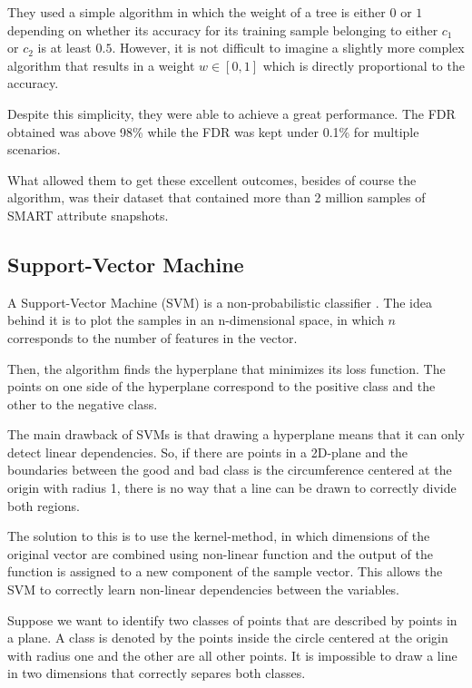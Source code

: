 They used a simple algorithm in which the weight of a tree is either $0$ or $1$ depending on whether its accuracy for its training sample belonging to either $c_1$ or $c_2$ is at least $0.5$.
However, it is not difficult to imagine a slightly more complex algorithm that results in a weight $w \in \left[0,1\right]$ which is directly proportional to the accuracy.

Despite this simplicity, they were able to achieve a great performance.
The FDR obtained was above 98\% while the FDR was kept under 0.1\% for multiple scenarios.

What allowed them to get these excellent outcomes, besides of course the algorithm, was their dataset that contained more than 2 million samples of SMART attribute snapshots.

\subsection{Support-Vector Machine}

A Support-Vector Machine (SVM) is a non-probabilistic classifier \cite{cortes1995support}.
The idea behind it is to plot the samples in an n-dimensional space, in which $n$ corresponds to the number of features in the vector.

Then, the algorithm finds the hyperplane that minimizes its loss function.
The points on one side of the hyperplane correspond to the positive class and the other to the negative class.

The main drawback of SVMs is that drawing a hyperplane means that it can only detect linear dependencies.
So, if there are points in a 2D-plane and the boundaries between the good and bad class is the circumference centered at the origin with radius 1, there is no way that a line can be drawn to correctly divide both regions.

The solution to this is to use the kernel-method, in which dimensions of the original vector are combined using non-linear function and the output of the function is assigned to a new component of the sample vector.
This allows the SVM to correctly learn non-linear dependencies between the variables.

Suppose we want to identify two classes of points that are described by points in a plane.
A class is denoted by the points inside the circle centered at the origin with radius one and the other are all other points.
It is impossible to draw a line in two dimensions that correctly separes both classes.

